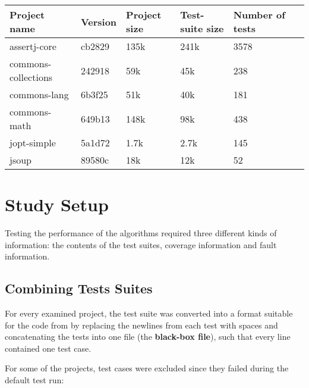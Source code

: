 \begin{table}[htpb]
	\caption[]{}\label{tab:projects} %
	\centering
	\begin{tabular}{l l l l l l}
		\toprule
		Project name & Version & Project size & Test-suite size & Number of tests \\
		\midrule
		assertj-core & cb2829 & 135k & 241k &3578 \\
		commons-collections & 242918 & 59k & 45k & 238 \\
		commons-lang & 6b3f25 & 51k & 40k & 181 \\
		commons-math & 649b13 & 148k & 98k & 438 \\
		jopt-simple & 5a1d72 & 1.7k & 2.7k & 145 \\
		jsoup & 89580c & 18k & 12k & 52 \\
		\bottomrule
	\end{tabular}
\end{table}


\section{Study Setup}

Testing the performance of the algorithms required three different kinds
of information: the contents of the test suites, coverage information
and fault information.

\subsection{Combining Tests Suites}

For every examined project, the test suite was converted into a format
suitable for the code from \cite{cruciani2019scalable} by replacing the
newlines from each test with spaces and concatenating the tests into
one file (the \textbf{black-box file}), such that every line contained
one test case.

For some of the projects, test cases were excluded since they failed
during the default test run:


